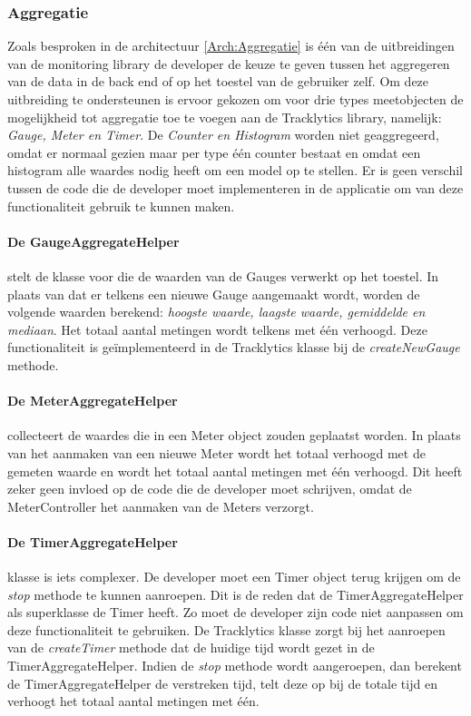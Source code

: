 \subsubsection{Aggregatie}
Zoals besproken in de architectuur \ref{Arch:Aggregatie} is \'e\'en van de uitbreidingen van de monitoring library de developer de keuze te geven tussen het aggregeren van de data in de back end of op het toestel van de gebruiker zelf. Om deze uitbreiding te ondersteunen is ervoor gekozen om voor drie types meetobjecten de mogelijkheid tot aggregatie toe te voegen aan de Tracklytics library, namelijk: \textit{Gauge, Meter en Timer}. De \textit{Counter en Histogram} worden niet geaggregeerd, omdat er normaal gezien maar per type \'e\'en counter bestaat en omdat een histogram alle waardes nodig heeft om een model op te stellen. Er is geen verschil tussen de code die de developer moet implementeren in de applicatie om van deze functionaliteit gebruik te kunnen maken.\\

\paragraph{De GaugeAggregateHelper} stelt de klasse voor die de waarden van de Gauges verwerkt op het toestel. In plaats van dat er telkens een nieuwe Gauge aangemaakt wordt, worden de volgende waarden berekend: \textit{hoogste waarde, laagste waarde, gemiddelde en mediaan}. Het totaal aantal metingen wordt telkens met \'e\'en verhoogd. Deze functionaliteit is ge\"implementeerd in de Tracklytics klasse bij de \textit{createNewGauge} methode. 

\paragraph{De MeterAggregateHelper} collecteert de waardes die in een Meter object zouden geplaatst worden. In plaats van het aanmaken van een nieuwe Meter wordt het totaal verhoogd met de gemeten waarde en wordt het totaal aantal metingen met \'e\'en verhoogd. Dit heeft zeker geen invloed op de code die de developer moet schrijven, omdat de MeterController het aanmaken van de Meters verzorgt.

\paragraph{De TimerAggregateHelper} klasse is iets complexer. De developer moet een Timer object terug krijgen om de \textit{stop} methode te kunnen aanroepen. Dit is de reden dat de TimerAggregateHelper als superklasse de Timer heeft. Zo moet de developer zijn code niet aanpassen om deze functionaliteit te gebruiken. De Tracklytics klasse zorgt bij het aanroepen van de \textit{createTimer} methode dat de huidige tijd wordt gezet in de TimerAggregateHelper. Indien de \textit{stop} methode wordt aangeroepen, dan berekent de TimerAggregateHelper de verstreken tijd, telt deze op bij de totale tijd en verhoogt het totaal aantal metingen met \'e\'en.



